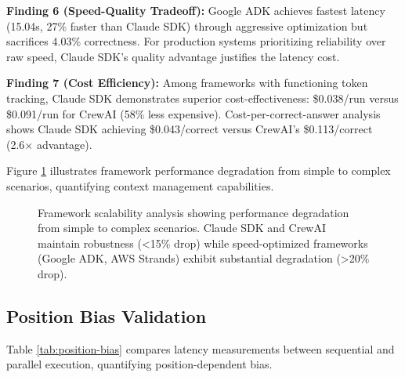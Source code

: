 \documentclass[sigconf,nonacm]{acmart}
\begin{document}
\textbf{Finding 6 (Speed-Quality Tradeoff):} Google ADK achieves fastest latency (15.04s, 27\% faster than Claude SDK) through aggressive optimization but sacrifices 4.03\% correctness. For production systems prioritizing reliability over raw speed, Claude SDK's quality advantage justifies the latency cost.

\textbf{Finding 7 (Cost Efficiency):} Among frameworks with functioning token tracking, Claude SDK demonstrates superior cost-effectiveness: \$0.038/run versus \$0.091/run for CrewAI (58\% less expensive). Cost-per-correct-answer analysis shows Claude SDK achieving \$0.043/correct versus CrewAI's \$0.113/correct (2.6× advantage).

Figure \ref{fig:scalability} illustrates framework performance degradation from simple to complex scenarios, quantifying context management capabilities.

\begin{figure}[h]
\centering
{}
\caption{Framework scalability analysis showing performance degradation from simple to complex scenarios. Claude SDK and CrewAI maintain robustness (<15\% drop) while speed-optimized frameworks (Google ADK, AWS Strands) exhibit substantial degradation (>20\% drop).}
\label{fig:scalability}
\end{figure}

\subsection{Position Bias Validation}

Table \ref{tab:position-bias} compares latency measurements between sequential and parallel execution, quantifying position-dependent bias.
\end{document}
